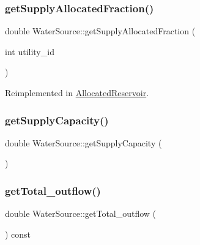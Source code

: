 \mbox{\label{classWaterSource_a71cb8bd481bbce0089aa78dcd1c3309a_a71cb8bd481bbce0089aa78dcd1c3309a}} 
\subsubsection{\texorpdfstring{get\+Supply\+Allocated\+Fraction()}{getSupplyAllocatedFraction()}}
{\footnotesize\ttfamily double Water\+Source\+::get\+Supply\+Allocated\+Fraction (\begin{DoxyParamCaption}\item[{int}]{utility\+\_\+id }\end{DoxyParamCaption})\hspace{0.3cm}{\ttfamily [virtual]}}



Reimplemented in \mbox{\hyperlink{classAllocatedReservoir_a114e9cde6a106b786ca0ed39283cbbed_a114e9cde6a106b786ca0ed39283cbbed}{Allocated\+Reservoir}}.

\mbox{\label{classWaterSource_aa4cbbd1ee0fc5ea9291eb5d8067b3aa0_aa4cbbd1ee0fc5ea9291eb5d8067b3aa0}} 
\subsubsection{\texorpdfstring{get\+Supply\+Capacity()}{getSupplyCapacity()}}
{\footnotesize\ttfamily double Water\+Source\+::get\+Supply\+Capacity (\begin{DoxyParamCaption}{ }\end{DoxyParamCaption})\hspace{0.3cm}{\ttfamily [virtual]}}

\mbox{\label{classWaterSource_a7678e05e3e73b927c0b47e3041d7415f_a7678e05e3e73b927c0b47e3041d7415f}} 
\subsubsection{\texorpdfstring{get\+Total\+\_\+outflow()}{getTotal\_outflow()}}
{\footnotesize\ttfamily double Water\+Source\+::get\+Total\+\_\+outflow (\begin{DoxyParamCaption}{ }\end{DoxyParamCaption}) const}

